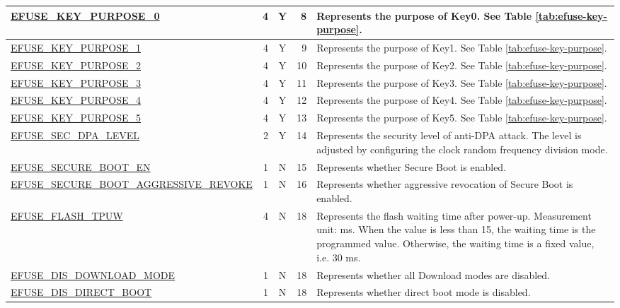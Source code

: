 \begin{longtable}[l]{ |m{8.2cm}|r|c|r|m{9cm}| }
    \hline
    \hyperref[fielddesc:EFUSEKEYPURPOSE0]{EFUSE\_KEY\_PURPOSE\_0} & 4 & Y & 8 & Represents the purpose of Key0. See Table \ref{tab:efuse-key-purpose}.\\
    \hline
    \hyperref[fielddesc:EFUSEKEYPURPOSE1]{EFUSE\_KEY\_PURPOSE\_1} & 4 & Y & 9 & Represents the purpose of Key1. See Table \ref{tab:efuse-key-purpose}.\\
    \hline
    \hyperref[fielddesc:EFUSEKEYPURPOSE2]{EFUSE\_KEY\_PURPOSE\_2} & 4 & Y & 10 & Represents the purpose of Key2. See Table \ref{tab:efuse-key-purpose}.\\
    \hline
    \hyperref[fielddesc:EFUSEKEYPURPOSE3]{EFUSE\_KEY\_PURPOSE\_3} & 4 & Y & 11 & Represents the purpose of Key3. See Table \ref{tab:efuse-key-purpose}.\\
    \hline
    \hyperref[fielddesc:EFUSEKEYPURPOSE4]{EFUSE\_KEY\_PURPOSE\_4} & 4 & Y & 12 & Represents the purpose of Key4. See Table \ref{tab:efuse-key-purpose}.\\
    \hline
    \hyperref[fielddesc:EFUSEKEYPURPOSE5]{EFUSE\_KEY\_PURPOSE\_5} & 4 & Y & 13 & Represents the purpose of Key5. See Table \ref{tab:efuse-key-purpose}.\\
    \hline
    \hyperref[fielddesc:EFUSESECDPALEVEL]{EFUSE\_SEC\_DPA\_LEVEL} & 2 & Y & 14 & Represents the security level of anti-DPA attack. The level is adjusted by configuring the clock random frequency division mode.\\
    \hline
    \hyperref[fielddesc:EFUSESECUREBOOTEN]{EFUSE\_SECURE\_BOOT\_EN} & 1 & N & 15 & Represents whether Secure Boot is enabled.\\
    \hline
    \hyperref[fielddesc:EFUSESECUREBOOTAGGRESSIVEREVOKE]{EFUSE\_SECURE\_BOOT\_AGGRESSIVE\_REVOKE} & 1 & N & 16 & Represents whether aggressive revocation of Secure Boot is enabled.\\
    \hline
    \hyperref[fielddesc:EFUSEFLASHTPUW]{EFUSE\_FLASH\_TPUW} & 4 & N & 18 & Represents the flash waiting time after power-up. Measurement unit: ms. When the value is less than 15, the waiting time is the programmed value. Otherwise, the waiting time is a fixed value, i.e. 30 ms.\\
    \hline
    \hyperref[fielddesc:EFUSEDISDOWNLOADMODE]{EFUSE\_DIS\_DOWNLOAD\_MODE} & 1 & N & 18 & Represents whether all Download modes are disabled.\\
    \hline
    \hyperref[fielddesc:EFUSEDISDIRECTBOOT]{EFUSE\_DIS\_DIRECT\_BOOT} & 1 & N & 18 & Represents whether direct boot mode is disabled.\\

\end{longtable}
